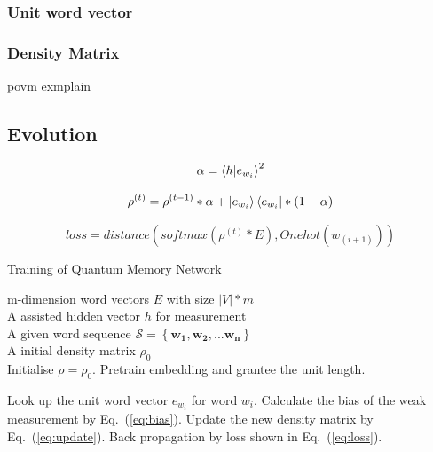 \documentclass{sig-alternate-05-2015}
\newcommand{\bs}{\boldsymbol}
\begin{document}
\subsubsection{Unit word vector}
\subsubsection{Density Matrix}
povm exmplain
\subsection{Evolution}


\begin{equation}
\alpha = \braket{h|e_{w_i}}^2
\label{eq:bias}
\end{equation}

\begin{equation}
\rho^{(t)} = \rho^{(t-1)} * \alpha + \ket{e_{w_i}}\bra{e_{w_i}} *(1-\alpha)
\label{eq:update}
\end{equation}

\begin{equation}
loss = distance(softmax(\rho^{(t)}*E), Onehot(w_(i+1)))
\label{eq:loss}
\end{equation}


\begin{algorithm}[t]
\caption{Training of Quantum Memory Network}
\label{algo:framework}
\begin{algorithmic}[1]
\small
\REQUIRE
m-dimension word vectors $E$ with size $|V|*m$ \\
\hspace{4mm} A assisted hidden vector $h$ for measurement   \\
\hspace{4mm} A given word sequence $\mathcal{S}=\left\{\bs{w_1},\bs{w_2},...\bs{w_n}\right\}$ \\
\hspace{4mm} A initial density matrix $\rho _0$   \\

\STATE
Initialise $\rho=\rho _0$.
\STATE
Pretrain  embedding and grantee the unit length.

\REPEAT
{}
\STATE
Look up the unit word vector $e_{w_i}$ for word $w_i$.
\STATE
Calculate the bias of the weak measurement by Eq.~({\ref{eq:bias}}).
\STATE
Update the new density matrix  by Eq.~({\ref{eq:update}}).
\STATE
Back propagation by loss shown in  Eq.~({\ref{eq:loss}}).
\ENDFOR

\end{algorithmic}
\end{algorithm}
\end{document}
